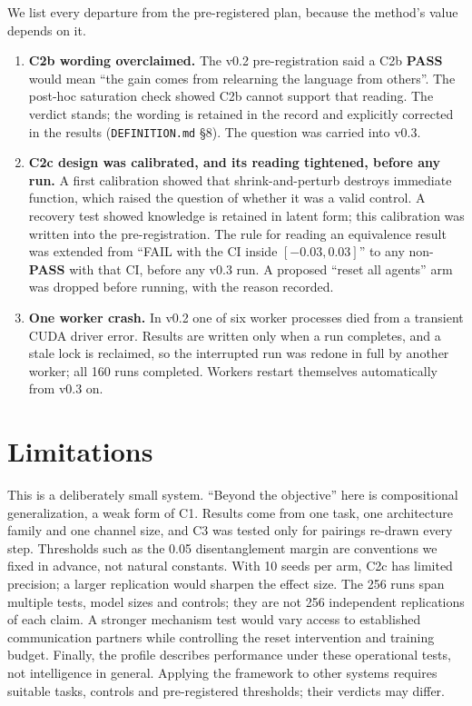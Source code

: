 \documentclass[11pt]{article}
\newcommand{\pass}{\textbf{PASS}}
\begin{document}
We list every departure from the pre-registered plan, because the method's value depends on it.
\begin{enumerate}
  \item \textbf{C2b wording overclaimed.} The v0.2 pre-registration said a C2b \pass{} would mean
        ``the gain comes from relearning the language from others''. The post-hoc saturation check
        showed C2b cannot support that reading. The verdict stands; the wording is retained in the
        record and explicitly corrected in the results (\texttt{DEFINITION.md} \S8). The question
        was carried into v0.3.
  \item \textbf{C2c design was calibrated, and its reading tightened, before any run.} A first
        calibration showed that shrink-and-perturb destroys immediate function, which raised the
        question of whether it was a valid control. A recovery test showed knowledge is retained in
        latent form; this calibration was written into the pre-registration. The rule for reading
        an equivalence result was extended from ``FAIL with the CI inside $[-0.03, 0.03]$'' to any
        non-\pass{} with that CI, before any v0.3 run. A proposed ``reset all agents'' arm was
        dropped before running, with the reason recorded.
  \item \textbf{One worker crash.} In v0.2 one of six worker processes died from a transient CUDA
        driver error. Results are written only when a run completes, and a stale lock is reclaimed,
        so the interrupted run was redone in full by another worker; all 160 runs completed. Workers
        restart themselves automatically from v0.3 on.
\end{enumerate}

\section{Limitations}

This is a deliberately small system. ``Beyond the objective'' here is compositional
generalization, a weak form of C1. Results come from one task, one architecture family and one
channel size, and C3 was tested only for pairings re-drawn every step. Thresholds such as the
0.05 disentanglement margin are conventions we fixed in advance, not natural constants. With 10
seeds per arm, C2c has limited precision; a larger replication would sharpen the effect size. The
256 runs span multiple tests, model sizes and controls; they are not 256 independent replications
of each claim. A stronger mechanism test would vary access to established communication partners
while controlling the reset intervention and training budget. Finally, the profile describes
performance under these operational tests, not intelligence in general. Applying the framework to
other systems requires suitable tasks, controls and pre-registered thresholds; their verdicts may
differ.
\end{document}
